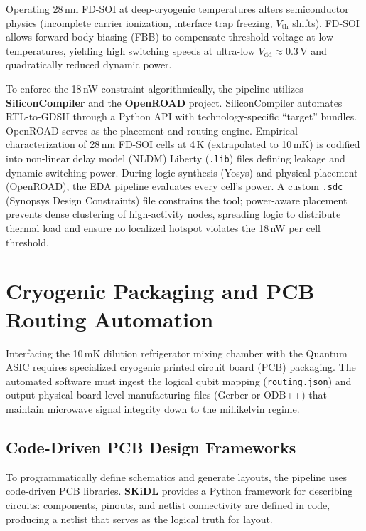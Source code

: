 \documentclass[11pt, a4paper]{article}
\begin{document}
Operating 28\,nm FD-SOI at deep-cryogenic temperatures alters semiconductor physics (incomplete carrier ionization, interface trap freezing, $V_{\mathrm{th}}$ shifts). FD-SOI allows forward body-biasing (FBB) to compensate threshold voltage at low temperatures, yielding high switching speeds at ultra-low $V_{\mathrm{dd}} \approx 0.3$\,V and quadratically reduced dynamic power.

To enforce the 18\,nW constraint algorithmically, the pipeline utilizes \textbf{SiliconCompiler} and the \textbf{OpenROAD} project. SiliconCompiler automates RTL-to-GDSII through a Python API with technology-specific ``target'' bundles. OpenROAD serves as the placement and routing engine. Empirical characterization of 28\,nm FD-SOI cells at 4\,K (extrapolated to 10\,mK) is codified into non-linear delay model (NLDM) Liberty (\texttt{.lib}) files defining leakage and dynamic switching power. During logic synthesis (Yosys) and physical placement (OpenROAD), the EDA pipeline evaluates every cell's power. A custom \texttt{.sdc} (Synopsys Design Constraints) file constrains the tool; power-aware placement prevents dense clustering of high-activity nodes, spreading logic to distribute thermal load and ensure no localized hotspot violates the 18\,nW per cell threshold.

\section{Cryogenic Packaging and PCB Routing Automation}

Interfacing the 10\,mK dilution refrigerator mixing chamber with the Quantum ASIC requires specialized cryogenic printed circuit board (PCB) packaging. The automated software must ingest the logical qubit mapping (\texttt{routing.json}) and output physical board-level manufacturing files (Gerber or ODB++) that maintain microwave signal integrity down to the millikelvin regime.

\subsection{Code-Driven PCB Design Frameworks}

To programmatically define schematics and generate layouts, the pipeline uses code-driven PCB libraries. \textbf{SKiDL} provides a Python framework for describing circuits: components, pinouts, and netlist connectivity are defined in code, producing a netlist that serves as the logical truth for layout.
\end{document}
